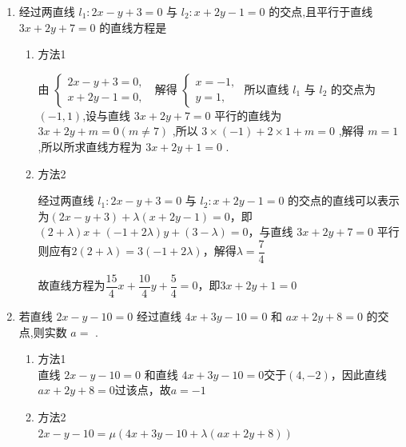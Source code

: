 \begin{enumerate}
\begin{jieda}
        又由 $\left\{  \begin{array}{l} {2x} - {3y} + 6 = 0 \\  y - 2 = 0 \end{array}\right.$ ,解得 $x = 0,y = 2$，即直线恒经过定点 $P\left( {0,2}\right)$ .

        \ps 解决直线过定点问题的问题中，实际就是将过两直线交点的直线系的方程表示出来，并求得两个方程的交点的过程.
    \end{jieda}
    \item 经过两直线 ${l}_{1} : {2x} - y + 3 = 0$ 与 ${l}_{2} : x + {2y} - 1 = 0$ 的交点,且平行于直线 ${3x} + {2y} + 7 = 0$ 的直线方程是
    \begin{jieda}
        \begin{enumerate}
            \item 方法1

            由 $\left\{  {\begin{array}{l} {2x} - y + 3 = 0, \\  x + {2y} - 1 = 0, \end{array}\;\text{ 解得 }\left\{  \begin{array}{l} x =  - 1, \\  y = 1, \end{array}\right. }\right.$ 所以直线 ${l}_{1}$ 与 ${l}_{2}$ 的交点为$(-1,1)$,设与直线 ${3x} + {2y} + 7 = 0$ 平行的直线为 ${3x} + {2y} + m = 0\left( {m \neq  7}\right)$ ,所以 $3 \times  \left( {-1}\right)  + 2 \times  1 + m = 0$ ,解得 $m = 1$ ,所以所求直线方程为 ${3x} + {2y} + 1 = 0$ .

            \item 方法2

            经过两直线 ${l}_{1} : {2x} - y + 3 = 0$ 与 ${l}_{2} : x + {2y} - 1 = 0$ 的交点的直线可以表示为$({2x} - y + 3) + \lambda (x + {2y} - 1) = 0$，即$(2+\lambda)x + (-1+2\lambda)y + (3-\lambda) = 0$，与直线 ${3x} + {2y} + 7 = 0$ 平行则应有$2(2+\lambda) = 3(-1+2\lambda)$，解得$\lambda = \dfrac{7}{4}$
            
            故直线方程为$\dfrac{15}{4}x+\dfrac{10}{4}y+\dfrac{5}{4} = 0$，即${3x} + {2y} + 1 = 0$
        \end{enumerate}
        
    \end{jieda}
    \item 若直线 ${2x} - y - {10} = 0$ 经过直线 ${4x} + {3y} - {10} = 0$ 和 ${ax} + {2y} + 8 = 0$ 的交点,则实数 $a =$ .
    \begin{jieda}
        \begin{enumerate}
            \item 方法1 \\
            直线 ${2x} - y - {10} = 0$ 和直线 ${4x} + {3y} - {10} = 0$交于$(4, -2)$，因此直线${ax} + {2y} + 8 = 0$过该点，故$a = -1$
            \item 方法2 \\
            ${2x} - y - {10} = \mu({4x} + {3y} - {10} + \lambda({ax} + {2y} + 8))$


\end{enumerate}
\end{jieda}
\end{enumerate}
